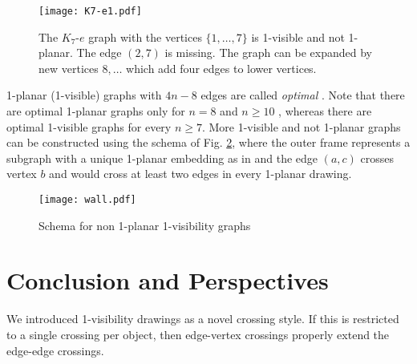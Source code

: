 \documentclass[runningheads]{llncs}
\begin{document}
\begin{figure}
   \begin{center}
  \texttt{[image: K7-e1.pdf]}
     \caption{The $K_7$-$e$ graph with the vertices $\{1,\ldots, 7 \}$ is 1-visible and not 1-planar.
     The edge $(2,7)$ is missing. The graph can be expanded by new vertices $8,\ldots$ which add four edges
     to lower vertices.}
     \label{fig:K7-e}
   \end{center}
\end{figure}

1-planar (1-visible) graphs with   $4n-8$ edges  are  called
\emph{optimal} \cite{bhw-1og-84,s-rm1pg-10}. Note that there are
optimal 1-planar graphs only for $n=8$ and $n \geq 10$
\cite{bhw-1og-84,s-rm1pg-10}, whereas there are optimal 1-visible
graphs for every $n \geq 7$. More 1-visible and not 1-planar graphs
can be constructed using the schema of Fig. \ref{fig:wall}, where
the outer frame represents a subgraph with a unique 1-planar
embedding as in \cite{km-mo1ih-13} and the edge $(a,c)$ crosses
vertex $b$ and would cross at least two edges in every 1-planar
drawing.

\begin{figure}
   \begin{center}
   \texttt{[image: wall.pdf]}
     \caption{Schema  for non 1-planar 1-visibility graphs}
     \label{fig:wall}
   \end{center}
\end{figure}


\section{Conclusion and Perspectives}

We introduced 1-visibility drawings as a novel crossing style. If
this is restricted to a single crossing per object, then edge-vertex
crossings properly extend the edge-edge crossings.
\end{document}
